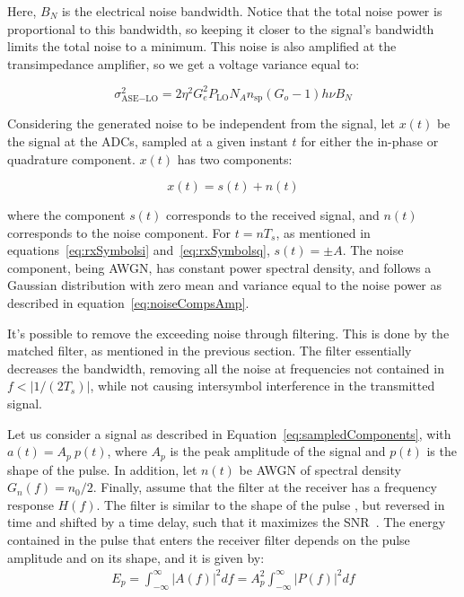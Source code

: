 	\noindent Here, $B_N$ is the electrical noise bandwidth. Notice that the total noise
	power is proportional to this bandwidth, so keeping it closer to the signal's
	bandwidth limits the total noise to a minimum. This noise is also amplified at
	the transimpedance amplifier, so we get a voltage variance equal to:

	\begin{equation}\label{eq:noiseCompsAmp}
		\sigma_{\text{ASE}-\text{LO}}^2 = 2 \eta^2 G_e^2 P_{\text{LO}} N_A n_{\text{sp}} (G_o - 1) h\nu B_N
	\end{equation}

	Considering the generated noise to be independent from the signal, let $x(t)$
	be the signal at the ADCs, sampled at a given instant $t$ for either the
	in-phase or quadrature component. $x(t)$ has two components:

	\begin{equation}\label{eq:sampledComponents}
		x(t) = s(t) + n(t)
	\end{equation}

	\noindent where the component $s(t)$ corresponds to the received signal, and
	$n(t)$ corresponds to the noise component. For $t = nT_s$, as mentioned in
	equations~\ref{eq:rxSymbolsi} and~\ref{eq:rxSymbolsq}, $s(t) = \pm A$. The
	noise component, being AWGN, has constant power spectral density, and follows
	a Gaussian distribution with zero mean and variance equal to the noise power
	as described in equation~\ref{eq:noiseCompsAmp}.

	It's possible to remove the exceeding noise through filtering. This is
	done by the matched filter, as mentioned in the previous
	section. The filter essentially decreases the bandwidth, removing all
	the noise at frequencies not contained in $f < \big|{1}/{(2T_s)}\big|$, while
	not causing intersymbol interference in the transmitted signal.

	Let us consider a signal as described in
	Equation~\ref{eq:sampledComponents}, with $ a(t) = A_p~p(t) $, where $A_p$ is the peak
	amplitude of the signal and $p(t)$ is the shape of the pulse. In addition, let $n(t)$ be AWGN
	of spectral density $G_n(f) = {n_0}/{2}$. Finally, assume that the filter
	at the receiver has a frequency response $H(f)$.
	The filter is similar to the shape of the pulse , but reversed in time and
	shifted by a time delay, such that it maximizes the SNR~\cite{carlson86}.
	The energy contained in the pulse that enters the receiver filter depends on the
	pulse amplitude and on its shape, and it is given by:
%
	\begin{eqnarray}\label{eq:pulseEnergy}
		E_p = \int_{-\infty}^{\infty} {|A(f)|}^2 df = A_p^2 \int_{-\infty}^{\infty} {|P(f)|}^2 df
	\end{eqnarray}

